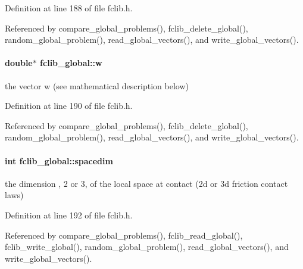 Definition at line 188 of file fclib.\+h.



Referenced by compare\+\_\+global\+\_\+problems(), fclib\+\_\+delete\+\_\+global(), random\+\_\+global\+\_\+problem(), read\+\_\+global\+\_\+vectors(), and write\+\_\+global\+\_\+vectors().

\hypertarget{structfclib__global_a8b175716b6c1f84509cf44b36a76e7ca}{}
\paragraph[{w}]{\setlength{\rightskip}{0pt plus 5cm}double$\ast$ fclib\+\_\+global\+::w}\label{structfclib__global_a8b175716b6c1f84509cf44b36a76e7ca}


the vector w (see mathematical description below) 



Definition at line 190 of file fclib.\+h.



Referenced by compare\+\_\+global\+\_\+problems(), fclib\+\_\+delete\+\_\+global(), random\+\_\+global\+\_\+problem(), read\+\_\+global\+\_\+vectors(), and write\+\_\+global\+\_\+vectors().

\hypertarget{structfclib__global_a86dac5928d2c652f15ac688df14989a0}{}
\paragraph[{spacedim}]{\setlength{\rightskip}{0pt plus 5cm}int fclib\+\_\+global\+::spacedim}\label{structfclib__global_a86dac5928d2c652f15ac688df14989a0}


the dimension , 2 or 3, of the local space at contact (2d or 3d friction contact laws) 



Definition at line 192 of file fclib.\+h.



Referenced by compare\+\_\+global\+\_\+problems(), fclib\+\_\+read\+\_\+global(), fclib\+\_\+write\+\_\+global(), random\+\_\+global\+\_\+problem(), read\+\_\+global\+\_\+vectors(), and write\+\_\+global\+\_\+vectors().

\hypertarget{structfclib__global_aa6b4e80afc92dd1a9b260ff3a096b352}{}
